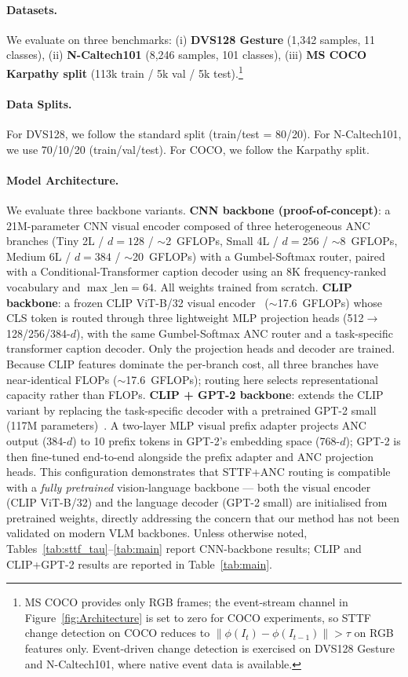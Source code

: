 \documentclass{article}
\begin{document}
\paragraph{Datasets.}
We evaluate on three benchmarks:
(i) \textbf{DVS128 Gesture} (1,342 samples, 11 classes),
(ii) \textbf{N-Caltech101} (8,246 samples, 101 classes),
(iii) \textbf{MS COCO Karpathy split} (113k train / 5k val / 5k test).\footnote{MS COCO provides only RGB frames; the event-stream channel in Figure~\ref{fig:Architecture} is set to zero for COCO experiments, so STTF change detection on COCO reduces to $\|\phi(I_t)-\phi(I_{t-1})\|>\tau$ on RGB features only. Event-driven change detection is exercised on DVS128 Gesture and N-Caltech101, where native event data is available.}

\paragraph{Data Splits.}
For DVS128, we follow the standard split (train/test = 80/20).
For N-Caltech101, we use 70/10/20 (train/val/test).
For COCO, we follow the Karpathy split.

\paragraph{Model Architecture.}
We evaluate three backbone variants.
\textbf{CNN backbone (proof-of-concept)}: a 21M-parameter CNN visual encoder composed of three heterogeneous ANC branches (Tiny 2L / $d{=}128$ / $\sim$2~GFLOPs, Small 4L / $d{=}256$ / $\sim$8~GFLOPs, Medium 6L / $d{=}384$ / $\sim$20~GFLOPs) with a Gumbel-Softmax router, paired with a Conditional-Transformer caption decoder using an 8K frequency-ranked vocabulary and $\max\_{\text{len}}{=}64$. All weights trained from scratch.
\textbf{CLIP backbone}: a frozen CLIP ViT-B/32 visual encoder~\cite{radford2021clip} ($\sim$17.6~GFLOPs) whose CLS token is routed through three lightweight MLP projection heads (512$\to$128/256/384-$d$), with the same Gumbel-Softmax ANC router and a task-specific transformer caption decoder. Only the projection heads and decoder are trained. Because CLIP features dominate the per-branch cost, all three branches have near-identical FLOPs ($\sim$17.6~GFLOPs); routing here selects representational capacity rather than FLOPs.
\textbf{CLIP + GPT-2 backbone}: extends the CLIP variant by replacing the task-specific decoder with a pretrained GPT-2 small (117M parameters)~\cite{radford2019gpt2}. A two-layer MLP visual prefix adapter projects ANC output (384-$d$) to 10 prefix tokens in GPT-2's embedding space (768-$d$); GPT-2 is then fine-tuned end-to-end alongside the prefix adapter and ANC projection heads. This configuration demonstrates that STTF+ANC routing is compatible with a \emph{fully pretrained} vision-language backbone --- both the visual encoder (CLIP ViT-B/32) and the language decoder (GPT-2 small) are initialised from pretrained weights, directly addressing the concern that our method has not been validated on modern VLM backbones.
Unless otherwise noted, Tables~\ref{tab:sttf_tau}--\ref{tab:main} report CNN-backbone results; CLIP and CLIP+GPT-2 results are reported in Table~\ref{tab:main}.
\end{document}
